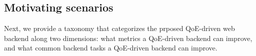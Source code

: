 \subsection{Motivating scenarios}
\label{subsec:benefits}
Next, we provide a taxonomy that categorizes the prposed QoE-driven web backend along two dimensions: 
what metrics a QoE-driven backend can improve, and what common backend tasks a QoE-driven backend can improve.

